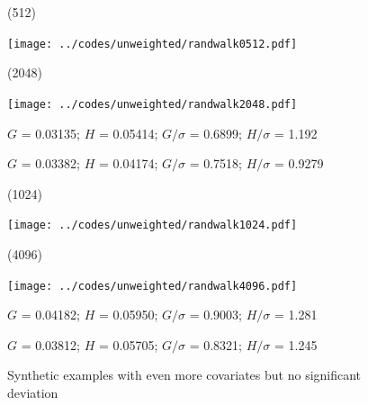 \documentclass{article}
\newlength{\vertsep}
\newlength{\imsize}
\newlength{\imsized}
\begin{document}
\begin{figure}
\begin{centering}
(512) \parbox{\imsize}{\texttt{[image: ../codes/unweighted/randwalk0512.pdf]}}
\quad
(2048) \parbox{\imsize}{\texttt{[image: ../codes/unweighted/randwalk2048.pdf]}}

\parbox{\imsized}{\hfil \footnotesize $G$ = 0.03135; $H$ = 0.05414;
$G/\sigma$ = 0.6899; $H/\sigma$ = 1.192}
\parbox{\imsized}{\hfil \footnotesize $G$ = 0.03382; $H$ = 0.04174;
$G/\sigma$ = 0.7518; $H/\sigma$ = 0.9279}

\vspace{\vertsep}

(1024) \parbox{\imsize}{\texttt{[image: ../codes/unweighted/randwalk1024.pdf]}}
\quad
(4096) \parbox{\imsize}{\texttt{[image: ../codes/unweighted/randwalk4096.pdf]}}

\parbox{\imsized}{\hfil \footnotesize $G$ = 0.04182; $H$ = 0.05950;
$G/\sigma$ = 0.9003; $H/\sigma$ = 1.281}
\parbox{\imsized}{\hfil \footnotesize $G$ = 0.03812; $H$ = 0.05705;
$G/\sigma$ = 0.8321; $H/\sigma$ = 1.245}
\end{centering}
\caption{Synthetic examples with even more covariates
but no significant deviation}
\label{randwalks}
\end{figure}
\end{document}

